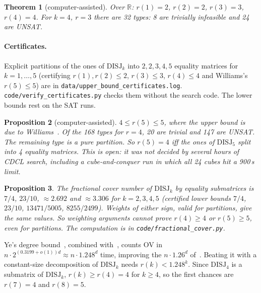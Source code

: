 \documentclass[11pt,a4paper]{article}
\theoremstyle{plain}
\newtheorem{theorem}{Theorem}
\newtheorem{proposition}[theorem]{Proposition}
\theoremstyle{definition}
\theoremstyle{remark}
\newcommand{\DISJ}{\mathrm{DISJ}}
\newcommand{\R}{\mathbb{R}}
\newcommand{\code}[1]{\texttt{\small #1}}
\begin{document}
\begin{theorem}[computer-assisted]\label{thm:eqrank}
Over $\R$: $r(1)=2$, $r(2)=2$, $r(3)=3$, $r(4)=4$. For $k=4$, $r=3$ there are 32 types: 8 are trivially infeasible and
24 are UNSAT.
\end{theorem}
\paragraph{Certificates.} Explicit partitions of the ones of $\DISJ_k$ into $2,2,3,4,5$ equality matrices for
$k=1,\dots,5$ (certifying $r(1),r(2)\le2$, $r(3)\le3$, $r(4)\le4$ and Williams's $r(5)\le5$) are in
\code{data/upper\_bound\_certificates.log}. \code{code/verify\_certificates.py} checks them without the search code.
The lower bounds rest on the SAT runs.

\begin{proposition}[computer-assisted]\label{prop:k5}
$4\le r(5)\le5$, where the upper bound is due to Williams~\cite{Wil24}. Of the 168 types for $r=4$, 20 are trivial and 147 are UNSAT. The remaining type is a pure partition.
So $r(5)=4$ iff the ones of $\DISJ_5$ split into 4 equality matrices. This is \emph{open}: it was not decided by
several hours of CDCL search, including a cube-and-conquer run in which all 24 cubes hit a 900\,s limit.
\end{proposition}

\begin{proposition}\label{prop:lp}
The fractional cover number of $\DISJ_k$ by equality submatrices is $7/4$, $23/10$, $\approx2.692$ and
$\approx3.306$ for $k=2,3,4,5$ (certified lower bounds $7/4$, $23/10$, $13471/5005$, $8255/2499$). Weights of either
sign, valid for partitions, give the same values. So weighting arguments cannot prove $r(4)\ge4$ or $r(5)\ge5$, even
for partitions. The computation is in \code{code/fractional\_cover.py}.
\end{proposition}

Ye's degree bound~\cite{Ye26}, combined with~\cite[Thm~7.2]{AL25}, counts OV in $n\cdot2^{(0.3199+o(1))d}\approx
n\cdot1.248^d$ time, improving the $n\cdot1.26^d$ of~\cite{AL25}. Beating it with a constant-size decomposition of $\DISJ_k$ needs
$r(k)<1.248^k$. Since $\DISJ_4$ is a submatrix of $\DISJ_k$, $r(k)\ge r(4)=4$ for $k\ge4$, so the first chances are $r(7)=4$ and $r(8)=5$.
\end{document}
